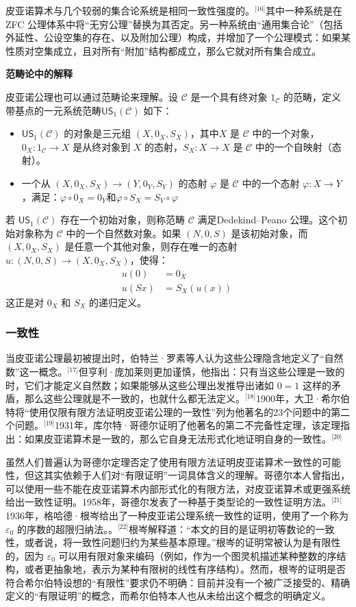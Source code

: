 皮亚诺算术与几个较弱的集合论系统是相同一致性强度的。\(^\text{[16]}\)其中一种系统是在 ZFC 公理体系中将“无穷公理”替换为其否定。另一种系统由“通用集合论”（包括外延性、公设空集的存在、以及附加公理）构成，并增加了一个公理模式：如果某性质对空集成立，且对所有“附加”结构都成立，那么它就对所有集合成立。

\textbf{范畴论中的解释}

皮亚诺公理也可以通过范畴论来理解。设 $\mathcal{C}$ 是一个具有终对象 $1_\mathcal{C}$ 的范畴，定义带基点的一元系统范畴$\mathsf{US}_1(\mathcal{C})$ 如下：
\begin{itemize}
\item $\mathsf{US}_1(\mathcal{C})$ 的对象是三元组 $(X, 0_X, S_X)$，其中$X$ 是 $\mathcal{C}$ 中的一个对象，$0_X : 1_\mathcal{C} \to X$ 是从终对象到 $X$ 的态射，$S_X : X \to X$ 是 $\mathcal{C}$ 中的一个自映射（态射）。
\item 一个从 $(X, 0_X, S_X)\to (Y, 0_Y, S_Y)$ 的态射 $\varphi$ 是 $\mathcal{C}$ 中的一个态射 $\varphi : X \to Y$，满足：$\varphi \circ 0_X = 0_Y$和$\varphi \circ S_X = S_Y \circ \varphi$
\end{itemize}
若 $\mathsf{US}_1(\mathcal{C})$ 存在一个初始对象，则称范畴 $\mathcal{C}$ 满足Dedekind–Peano 公理。这个初始对象称为 $\mathcal{C}$ 中的一个自然数对象。如果 $(N, 0, S)$ 是该初始对象，而 $(X, 0_X, S_X)$ 是任意一个其他对象，则存在唯一的态射 $u : (N, 0, S) \to (X, 0_X, S_X)$，使得：
$$
\begin{aligned}
u(0) &= 0_X \\
u(Sx) &= S_X(u(x))
\end{aligned}~
$$
这正是对 $0_X$ 和 $S_X$ 的递归定义。
\subsubsection{一致性}
当皮亚诺公理最初被提出时，伯特兰·罗素等人认为这些公理隐含地定义了“自然数”这一概念。\(^\text{[17]}\)但亨利·庞加莱则更加谨慎，他指出：只有当这些公理是一致的时，它们才能定义自然数；如果能够从这些公理出发推导出诸如 $0 = 1$ 这样的矛盾，那么这些公理就是不一致的，也就什么都无法定义。\(^\text{[18]}\)1900年，大卫·希尔伯特将“使用仅限有限方法证明皮亚诺公理的一致性”列为他著名的23个问题中的第二个问题。\(^\text{[19]}\)1931年，库尔特·哥德尔证明了他著名的第二不完备性定理，该定理指出：如果皮亚诺算术是一致的，那么它自身无法形式化地证明自身的一致性。\(^\text{[20]}\)

虽然人们普遍认为哥德尔定理否定了使用有限方法证明皮亚诺算术一致性的可能性，但这其实依赖于人们对“有限证明”一词具体含义的理解。哥德尔本人曾指出，可以使用一些不能在皮亚诺算术内部形式化的有限方法，对皮亚诺算术或更强系统给出一致性证明。1958年，哥德尔发表了一种基于类型论的一致性证明方法。\(^\text{[21]}\)1936年，格哈德·根岑给出了一种皮亚诺公理系统一致性的证明，使用了一个称为 $\varepsilon_0$ 的序数的超限归纳法。。\(^\text{[22]}\)根岑解释道：“本文的目的是证明初等数论的一致性，或者说，将一致性问题归约为某些基本原理。”根岑的证明常被认为是有限性的，因为 $\varepsilon_0$ 可以用有限对象来编码（例如，作为一个图灵机描述某种整数的序结构，或者更抽象地，表示为某种有限树的线性有序结构）。然而，根岑的证明是否符合希尔伯特设想的“有限性”要求仍不明确：目前并没有一个被广泛接受的、精确定义的“有限证明”的概念，而希尔伯特本人也从未给出这个概念的明确定义。

